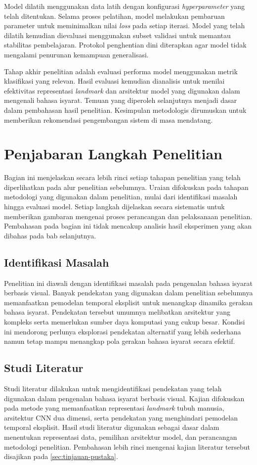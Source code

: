 Model dilatih menggunakan data latih dengan konfigurasi \textit{hyperparameter} yang telah ditentukan. 
Selama proses pelatihan, model melakukan pembaruan parameter untuk meminimalkan nilai \textit{loss} pada setiap iterasi. 
Model yang telah dilatih kemudian dievaluasi menggunakan subset validasi untuk memantau stabilitas pembelajaran. 
Protokol penghentian dini diterapkan agar model tidak mengalami penurunan kemampuan generalisasi.

Tahap akhir penelitian adalah evaluasi performa model menggunakan metrik klasifikasi yang relevan. 
Hasil evaluasi kemudian dianalisis untuk menilai efektivitas representasi \textit{landmark} dan arsitektur model yang digunakan dalam mengenali bahasa isyarat. 
Temuan yang diperoleh selanjutnya menjadi dasar dalam pembahasan hasil penelitian. 
Kesimpulan metodologis dirumuskan untuk memberikan rekomendasi pengembangan sistem di masa mendatang.

\section{Penjabaran Langkah Penelitian}
\label{sec:jabar-alur}
Bagian ini menjelaskan secara lebih rinci setiap tahapan penelitian yang telah diperlihatkan pada alur penelitian sebelumnya. 
Uraian difokuskan pada tahapan metodologi yang digunakan dalam penelitian, mulai dari identifikasi masalah hingga evaluasi model. 
Setiap langkah dijelaskan secara sistematis untuk memberikan gambaran mengenai proses perancangan dan pelaksanaan penelitian. 
Pembahasan pada bagian ini tidak mencakup analisis hasil eksperimen yang akan dibahas pada bab selanjutnya.

\subsection{Identifikasi Masalah}
\label{subsec:identifikasi-masalah}
Penelitian ini diawali dengan identifikasi masalah pada pengenalan bahasa isyarat berbasis visual. 
Banyak pendekatan yang digunakan dalam penelitian sebelumnya memanfaatkan pemodelan temporal eksplisit untuk menangkap dinamika gerakan bahasa isyarat. 
Pendekatan tersebut umumnya melibatkan arsitektur yang kompleks serta memerlukan sumber daya komputasi yang cukup besar. 
Kondisi ini mendorong perlunya eksplorasi pendekatan alternatif yang lebih sederhana namun tetap mampu menangkap pola gerakan bahasa isyarat secara efektif.

\subsection{Studi Literatur}
\label{subsec:studi-literatur}
Studi literatur dilakukan untuk mengidentifikasi pendekatan yang telah digunakan dalam pengenalan bahasa isyarat berbasis visual. 
Kajian difokuskan pada metode yang memanfaatkan representasi \textit{landmark} tubuh manusia, arsitektur CNN dua dimensi, serta pendekatan yang menghindari pemodelan temporal eksplisit. 
Hasil studi literatur digunakan sebagai dasar dalam menentukan representasi data, pemilihan arsitektur model, dan perancangan metodologi penelitian. 
Pembahasan lebih rinci mengenai kajian literatur tersebut disajikan pada \ref{sec:tinjauan-pustaka}.

